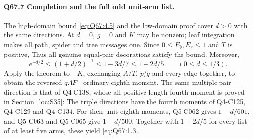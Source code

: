 \paragraph{Q67.7 Completion and the full odd unit-arm list.}
The high-domain bound \eqref{eq:Q67:4.5} and the low-domain proof
cover \(d>\allowbreak 0\) with the same directions.
At \(d=\allowbreak 0\), \(g=\allowbreak 0\) and \(K\) may be nonzero; leaf integration
makes all path, spider and tree messages one.
Since \(0\le\allowbreak  E_0,\allowbreak E_r\le\allowbreak 1\) and \(T\) is positive,
Thus all genuine equal-pair decorations satisfy the bound. Moreover,
\begin{equation}\tag{Q67.7.1}\label{eq:Q67:7.1}
e^{-d/2}\le(1+d/2)^{-1}\le1-3d/7\le1-2d/5
\qquad(0\le d\le1/3).
\end{equation}
Apply the theorem to \(-K\), exchanging \(A/T\), \(p/q\) and every
edge together, to obtain the reversed \(qAF^-\) ordinary eighth moment.
The same multiple-pair direction is that of Q4-C138, whose
all-positive-length fourth moment is proved in Section~\ref{loc:S35}:
The triple directions have the fourth moments of Q4-C125, Q4-C129
and Q4-C134. For their unit eighth moments, Q5-C062 gives
\(1-d/601\), and Q5-C063 and Q5-C065 give \(1-d/500\).
Together with \(1-2d/5\) for every list of at least five arms,
these yield \eqref{eq:Q67:1.3}.
